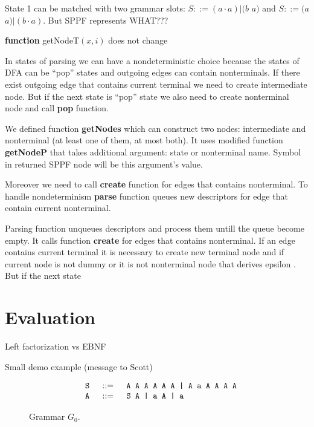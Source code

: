 \documentclass[runningheads,a4paper]{llncs}
\begin{document}
State 1 can be matched with two grammar slots: $S ::= (a \cdot a)|(b$ $a)$ and $S ::= (a$ $a)|(b \cdot a)$. 
But SPPF represents WHAT???




\textbf{function} getNodeT$(x,i)$ does not change

In states of parsing we can have a nondeterministic choice because the states of DFA can be ``pop'' states and outgoing edges can contain nonterminals.
If there exist outgoing edge that contains current terminal we need to create intermediate node.
But if the next state is ``pop'' state we also need to create nonterminal node and call \textbf{pop} function.

We defined function \textbf{getNodes} which can construct two nodes: intermediate and nonterminal (at least one of them, at most both).
It uses modified function \textbf{getNodeP} that takes additional argument: state or nonterminal name. Symbol in returned SPPF node will be this argument's value.



Moreover we need to call \textbf{create} function for edges that contains nonterminal.
To handle nondeterminism \textbf{parse} function queues new descriptors for edge that contain current nonterminal.

Parsing function unqueues descriptors and process them untill the queue become empty.
It calls function \textbf{create} for edges that contains nonterminal.
If an edge contains current terminal it is necessary to create new terminal node and if current node is not dummy or it is not nonterminal node that derives epsilon . But if the next state  





\section{Evaluation}

Left factorization vs EBNF

Small demo example (message to Scott)

\begin{figure}[h]
$$
\begin{array}{crcl}
& \mbox{\texttt{ S }} &::=& \mbox{\texttt{ A A A A A A | A a A A A A }} \\
& \mbox{\texttt{ A }} & ::=& \mbox{\texttt{ S A | a A | a}}\\
\end{array}
$$
\caption{Grammar $G_0$.}
\label{testGrammar}
\end{figure}
\end{document}
